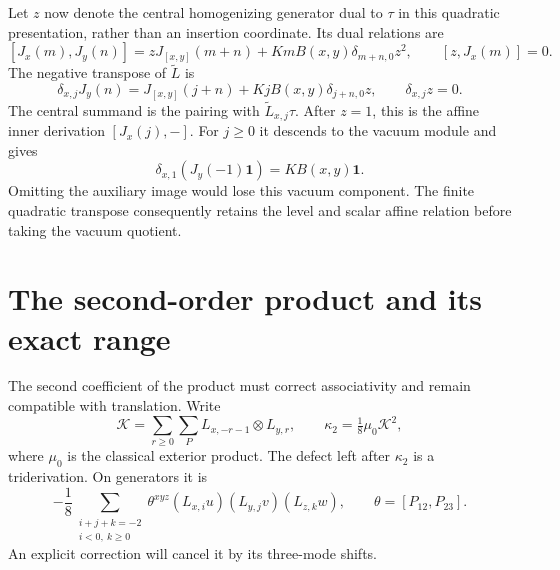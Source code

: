 Let $z$ now denote the central homogenizing generator dual to $\tau$
in this quadratic presentation, rather than an insertion coordinate.
Its dual relations are
\[
 [J_x(m),J_y(n)]
  =zJ_{[x,y]}(m+n)+KmB(x,y)\delta_{m+n,0}z^2,
 \qquad [z,J_x(m)]=0.
\]
The negative transpose of $\widetilde L$ is
\[
 \delta_{x,j}J_y(n)
   =J_{[x,y]}(j+n)+KjB(x,y)\delta_{j+n,0}z,
 \qquad \delta_{x,j}z=0.
\]
The central summand is the pairing with $\widetilde L_{x,j}\tau$.
After $z=1$, this is the affine inner derivation $[J_x(j),-]$.
For $j\geq0$ it descends to the vacuum module and gives
\begin{equation}\label{cyquant:eq:affine-vacuum}
 \delta_{x,1}(J_y(-1)\mathbf1)=KB(x,y)\mathbf1.
\end{equation}
Omitting the auxiliary image would lose this vacuum component.  The
finite quadratic transpose consequently retains the level and scalar
affine relation before taking the vacuum quotient.

\section{The second-order product and its exact range}
\label{cyquant:sec:second-order}

The second coefficient of the product must correct associativity and
remain compatible with translation.  Write
\[
 \mathcal K=\sum_{r\geq0}\sum_P L_{x,-r-1}\otimes L_{y,r},
 \qquad \kappa_2=\tfrac18\mu_0\mathcal K^2,
\]
where $\mu_0$ is the classical exterior product.
The defect left after $\kappa_2$ is a triderivation.  On generators
it is
\[
 -\frac18\sum_{\substack{i+j+k=-2\\i<0,\ k\geq0}}
       \theta^{xyz}(L_{x,i}u)(L_{y,j}v)(L_{z,k}w),
 \qquad \theta=[P_{12},P_{23}].
\]
An explicit correction will cancel it by its three-mode shifts.

